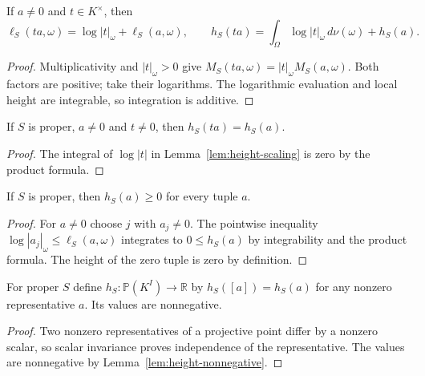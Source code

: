 \begin{lemma}\label{lem:height-scaling}
\leanok
If $a\ne0$ and $t\in K^\times$, then
\[
 \ell_S(ta,\omega)=\log|t|_\omega+\ell_S(a,\omega),\qquad
 h_S(ta)=\int_\Omega\log|t|_\omega\,d\nu(\omega)+h_S(a).
\]
\end{lemma}
\begin{proof}
Multiplicativity and $|t|_\omega>0$ give
$M_S(ta,\omega)=|t|_\omega M_S(a,\omega)$.
Both factors are positive; take their logarithms. The logarithmic
evaluation and local height are integrable, so integration is additive.
\end{proof}

\begin{proposition}\label{prop:height-scalar-invariant}
\leanok
If $S$ is proper, $a\ne0$ and $t\ne0$, then $h_S(ta)=h_S(a)$.
\end{proposition}
\begin{proof}
The integral of $\log|t|$ in Lemma~\ref{lem:height-scaling} is zero
by the product formula.
\end{proof}

\begin{lemma}[Nonnegativity]\label{lem:height-nonnegative}
\leanok
If $S$ is proper, then $h_S(a)\geq0$ for every tuple $a$.
\end{lemma}
\begin{proof}
For $a\ne0$ choose $j$ with $a_j\ne0$. The pointwise inequality
$\log|a_j|_\omega\leq\ell_S(a,\omega)$ integrates to
$0\leq h_S(a)$ by integrability and the product formula.
The height of the zero tuple is zero by definition.
\end{proof}

\begin{definition}\label{def:projective-height}
\leanok
For proper $S$ define $h_S:\mathbb P(K^I)\to\mathbb R$ by
$h_S([a])=h_S(a)$ for any nonzero representative $a$. Its values are nonnegative.
\end{definition}
\begin{proof}
Two nonzero representatives of a projective point differ by a nonzero
scalar, so scalar invariance proves independence of the representative.
The values are nonnegative by Lemma~\ref{lem:height-nonnegative}.
\end{proof}

